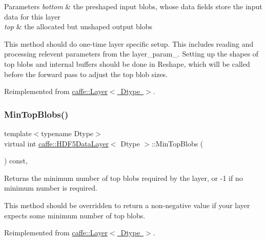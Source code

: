 \begin{DoxyParams}{Parameters}
{\em bottom} & the preshaped input blobs, whose data fields store the input data for this layer \\
\hline
{\em top} & the allocated but unshaped output blobs\\
\hline
\end{DoxyParams}
This method should do one-\/time layer specific setup. This includes reading and processing relevent parameters from the {\ttfamily layer\+\_\+param\+\_\+}. Setting up the shapes of top blobs and internal buffers should be done in {\ttfamily Reshape}, which will be called before the forward pass to adjust the top blob sizes. 

Reimplemented from \mbox{\hyperlink{classcaffe_1_1_layer_a481323a3e0972c682787f2137468c29f}{caffe\+::\+Layer$<$ Dtype $>$}}.

\mbox{\label{classcaffe_1_1_h_d_f5_data_layer_a6833e081c29049b1392eb98fb4451697}} 
\subsubsection{\texorpdfstring{Min\+Top\+Blobs()}{MinTopBlobs()}\hspace{0.1cm}{\footnotesize\ttfamily [1/2]}}
{\footnotesize\ttfamily template$<$typename Dtype$>$ \\
virtual int \mbox{\hyperlink{classcaffe_1_1_h_d_f5_data_layer}{caffe\+::\+H\+D\+F5\+Data\+Layer}}$<$ Dtype $>$\+::Min\+Top\+Blobs (\begin{DoxyParamCaption}{ }\end{DoxyParamCaption}) const\hspace{0.3cm}{\ttfamily [inline]}, {\ttfamily [virtual]}}



Returns the minimum number of top blobs required by the layer, or -\/1 if no minimum number is required. 

This method should be overridden to return a non-\/negative value if your layer expects some minimum number of top blobs. 

Reimplemented from \mbox{\hyperlink{classcaffe_1_1_layer_ab9e4c8d642e413948b131d851a8462a4}{caffe\+::\+Layer$<$ Dtype $>$}}.

